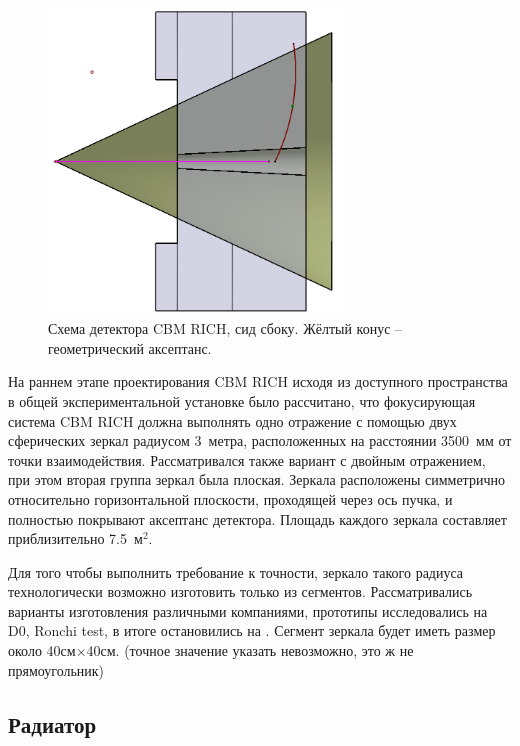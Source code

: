 \begin{figure}[H]
\centering
\includegraphics[width=0.7\textwidth]{pictures/RICH_construction.png}
\caption{Схема детектора CBM RICH, сид сбоку. Жёлтый конус -- геометрический аксептанс.}
\label{fig:RICHconstruction}
\end{figure}

На раннем этапе проектирования CBM RICH исходя из доступного пространства в общей экспериментальной установке было рассчитано, что фокусирующая система CBM RICH должна выполнять одно отражение с помощью двух сферических зеркал радиусом 3~метра, расположенных на расстоянии 3500~мм от точки взаимодействия. Рассматривался также вариант с двойным отражением, при этом вторая группа зеркал была плоская. Зеркала расположены симметрично относительно горизонтальной плоскости, проходящей через ось пучка, и полностью покрывают аксептанс детектора. Площадь каждого зеркала составляет приблизительно 7.5~м$^2$.

Для того чтобы выполнить требование к точности, зеркало такого радиуса технологически возможно изготовить только из сегментов. Рассматривались варианты изготовления различными компаниями, прототипы исследовались на \todo D0, Ronchi test, в итоге остановились на \todo.
Сегмент зеркала будет иметь размер около 40см$\times$40см. (точное значение указать невозможно, это ж не прямоугольник)

\subsection{Радиатор}

